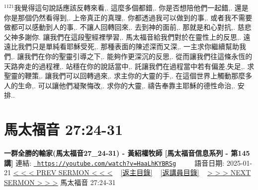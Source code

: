 \documentclass{book}
\begin{document}
$^{1121}$我覺得這句說話應該反轉來看,.
這麼多個都錯,.
你是否想陪他們一起錯,.
還是你是那個仍然看得到,.
上帝真正的真理,.
你都透過我可以做到的事,.
或者我不需要做都可以感動到人的事,.
不讓人回轉回來,.
去到神的面前,.
那就是和心對抗,.
慈悲父神多謝你.
讓我們在這段聖經裡學習,.
馬太福音給我們對於在靈性上的反思,.
遠遠比我們只是單純看耶穌受死,.
那種表面的陳述深而又深,.
一主求你繼續幫助我們,.
讓我們在你的聖靈引導之下,.
能夠作更深沉的反思,.
從而讓我們往這條永恆的天路奔走的過程裡,.
站穩在你的說話當中,.
託讓我們在過程當中若有偏差,失足,.
求聖靈的鞭策,.
讓我們可以回轉過來,.
求主你的大靈的手,.
在這個世界上觸動那麼多人的生命,.
可以讓他們凝聚悔改,.
求你的大靈,.
禱告奉靠主耶穌的德性命治,.
安排..
\newpage



\section{馬太福音 27:24-31}
\label{sec:HaaLhKYBRSg}
\textbf{一群全勝的輸家(馬太福音27\_24-31) - 黃紹權牧師  [馬太福音信息系列 - 第145講]}
\newline
\newline
連結: \href{https://youtube.com/watch?v=HaaLhKYBRSg}{\texttt{ https://youtube.com/watch?v=HaaLhKYBRSg}} ~~~~ 語音日期: 2025-01-21 
\newline
\newline
\hyperref[sec:ZN4O4BAmHMA]{< < < PREV SERMON < < <}
~
\hyperlink{toc}{[返主目錄]}
~
\hyperref[ch:preacher10]{[返講員目錄]}
~
\hyperref[sec:oCpi7n8ictU]{> > > NEXT SERMON > > >}
\newline
\newline
馬太福音 27:24-31
\newline
\end{document}

